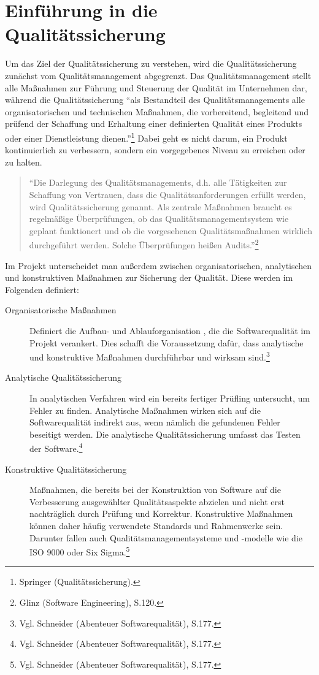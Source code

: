 \chapter{Einführung in die Qualitätssicherung}
\label{cha:einfuehrungQS}

    Um das Ziel der Qualitätssicherung zu verstehen, wird die Qualitätssicherung zunächst vom Qualitätsmanagement abgegrenzt. Das Qualitätsmanagement stellt alle Maßnahmen zur Führung und Steuerung der Qualität im Unternehmen dar, während die Qualitätssicherung \enquote{als Bestandteil des Qualitätsmanagements alle organisatorischen und technischen Maßnahmen, die vorbereitend, begleitend und prüfend der Schaffung und Erhaltung einer definierten Qualität eines Produkts oder einer Dienstleistung dienen.}\footnote{Springer (Qualitätssicherung).} Dabei geht es nicht darum, ein Produkt kontinuierlich zu verbessern, sondern ein vorgegebenes Niveau zu erreichen oder zu halten.

    \begin{quote}
        \enquote{Die Darlegung des Qualitätsmanagements, d.h. alle Tätigkeiten zur Schaffung von Vertrauen, dass die Qualitätsanforderungen erfüllt werden, wird Qualitätssicherung genannt. Als zentrale Maßnahmen braucht es regelmäßige Überprüfungen, ob das Qualitätsmanagementsystem wie geplant funktionert und ob die vorgesehenen Qualitätsmaßnahmen wirklich durchgeführt werden. Solche Überprüfungen heißen Audits.}\footnote{Glinz (Software Engineering), S.120.}
    \end{quote}

    Im Projekt unterscheidet man außerdem zwischen organisatorischen, analytischen und konstruktiven Maßnahmen zur Sicherung der Qualität. Diese werden im Folgenden definiert:

    \begin{description}
        \item[Organisatorische Maßnahmen] Definiert die Aufbau- und Ablauforganisation , die die Softwarequalität im Projekt verankert. Dies schafft die Voraussetzung dafür, dass analytische und konstruktive Maßnahmen durchführbar und wirksam sind.\footnote{Vgl. Schneider (Abenteuer Softwarequalität), S.177.}
        \item[Analytische Qualitätssicherung] In analytischen Verfahren wird ein bereits fertiger Prüfling untersucht, um Fehler zu finden. Analytische Maßnahmen wirken sich auf die Softwarequalität indirekt aus, wenn nämlich die gefundenen Fehler beseitigt werden. Die analytische Qualitätssicherung umfasst das Testen der Software.\footnote{Vgl. Schneider (Abenteuer Softwarequalität), S.177.}
        \item[Konstruktive Qualitätssicherung] Maßnahmen, die bereits bei der Konstruktion von Software auf die Verbesserung ausgewählter Qualitätsaspekte abzielen und nicht erst nachträglich durch Prüfung und Korrektur. Konstruktive Maßnahmen können daher häufig verwendete Standards und Rahmenwerke sein. Darunter fallen auch Qualitätsmanagementsysteme und -modelle wie die ISO 9000 oder Six Sigma.\footnote{Vgl. Schneider (Abenteuer Softwarequalität), S.177.}
    \end{description}

